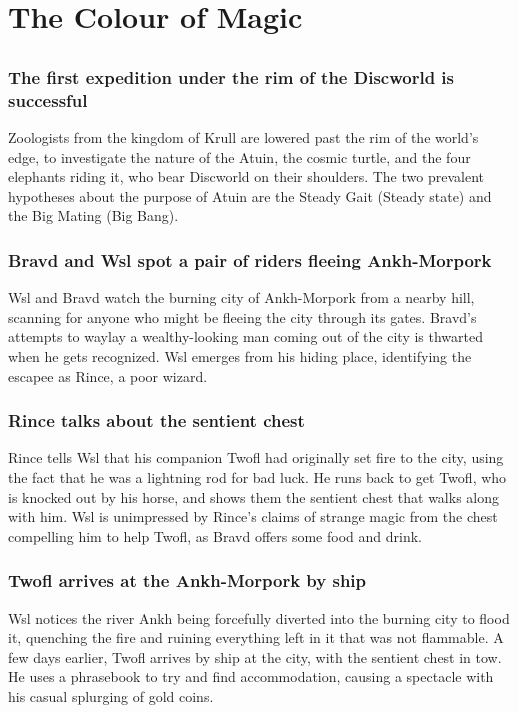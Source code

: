 \section{The Colour of Magic}


\subsection{}
\subsubsection{The first expedition under the rim of the Discworld is successful}
Zoologists from the kingdom of Krull are lowered past the rim of the world's edge, to investigate
the nature of the \Gls{Atuin}, the cosmic turtle, and the four elephants riding it, who bear
Discworld on their shoulders. The two prevalent hypotheses about the purpose of \Gls{Atuin} are the
Steady Gait (Steady state) and the Big Mating (Big Bang).

\subsubsection{\Gls{Bravd} and \Gls{Wsl} spot a pair of riders fleeing Ankh-Morpork}
\Gls{Wsl} and \Gls{Bravd} watch the burning city of Ankh-Morpork from a nearby hill, scanning for
anyone who might be fleeing the city through its gates. \Gls{Bravd}'s attempts to waylay a
wealthy-looking man coming out of the city is thwarted when he gets recognized. \Gls{Wsl} emerges
from his hiding place, identifying the escapee as \Gls{Rince}, a poor wizard.

\subsubsection{\Gls{Rince} talks about the sentient chest}
\Gls{Rince} tells \Gls{Wsl} that his companion \Gls{Twofl} had originally set fire to the city,
using the fact that he was a lightning rod for bad luck. He runs back to get \Gls{Twofl}, who is
knocked out by his horse, and shows them the sentient chest that walks along with him. \Gls{Wsl}
is unimpressed by \Gls{Rince}'s claims of strange magic from the chest compelling him to help
\Gls{Twofl}, as \Gls{Bravd} offers some food and drink.

\subsubsection{\Gls{Twofl} arrives at the Ankh-Morpork by ship}
\Gls{Wsl} notices the river Ankh being forcefully diverted into the burning city to flood it,
quenching the fire and ruining everything left in it that was not flammable. A few days earlier,
\Gls{Twofl} arrives by ship at the city, with the sentient chest in tow. He uses a phrasebook to
try and find accommodation, causing a spectacle with his casual splurging of gold coins.

